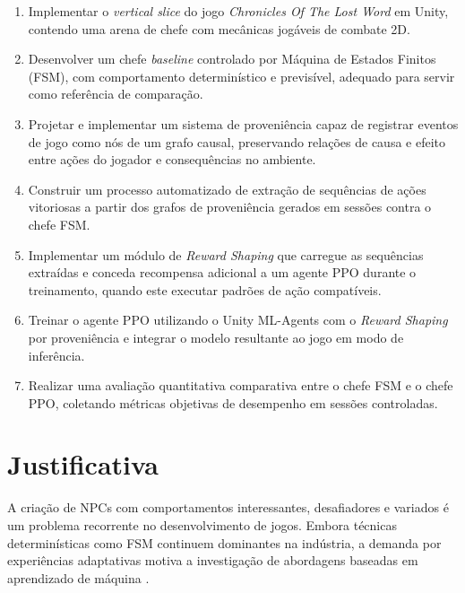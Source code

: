 \begin{enumerate}
    \item Implementar o \textit{vertical slice} do jogo \textit{Chronicles Of
          The Lost Word} em Unity, contendo uma arena de chefe com mecânicas
          jogáveis de combate 2D.

    \item Desenvolver um chefe \textit{baseline} controlado por Máquina de
          Estados Finitos (FSM), com comportamento determinístico e
          previsível, adequado para servir como referência de comparação.

    \item Projetar e implementar um sistema de proveniência capaz de registrar
          eventos de jogo como nós de um grafo causal, preservando relações
          de causa e efeito entre ações do jogador e consequências no
          ambiente.

    \item Construir um processo automatizado de extração de sequências de
          ações vitoriosas a partir dos grafos de proveniência gerados em
          sessões contra o chefe FSM.

    \item Implementar um módulo de \textit{Reward Shaping} que carregue as
          sequências extraídas e conceda recompensa adicional a um agente PPO
          durante o treinamento, quando este executar padrões de ação
          compatíveis.

    \item Treinar o agente PPO utilizando o Unity ML-Agents com o
          \textit{Reward Shaping} por proveniência e integrar o modelo
          resultante ao jogo em modo de inferência.

    \item Realizar uma avaliação quantitativa comparativa entre o chefe FSM e
          o chefe PPO, coletando métricas objetivas de desempenho em sessões
          controladas.
\end{enumerate}

\section{Justificativa}
\label{sec:justificativa}

A criação de NPCs com comportamentos interessantes, desafiadores e variados é
um problema recorrente no desenvolvimento de jogos. Embora técnicas
determinísticas como FSM continuem dominantes na indústria, a demanda por
experiências adaptativas motiva a investigação de abordagens baseadas em
aprendizado de máquina \cite{yannakakis2018artificial}.

